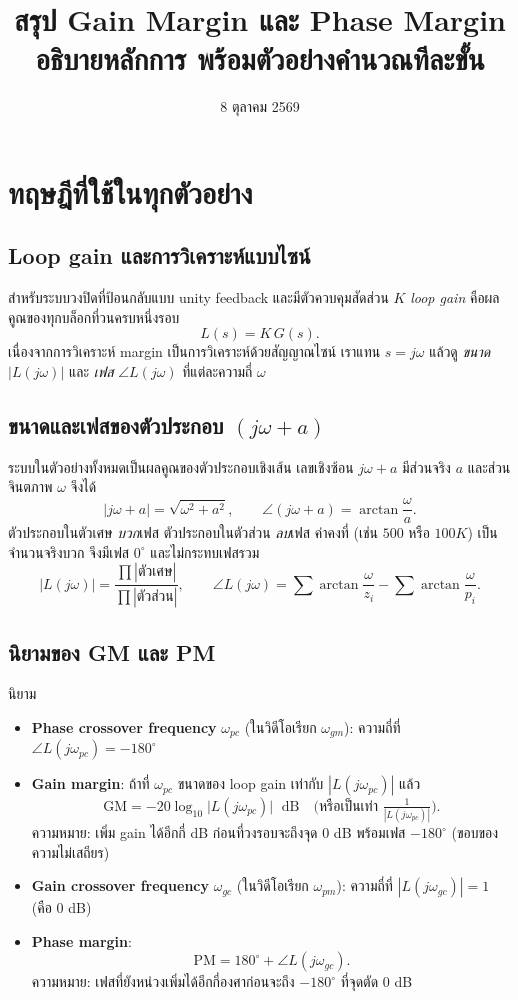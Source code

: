 \documentclass[12pt,a4paper]{article}
\title{สรุป Gain Margin และ Phase Margin\\[2pt]\large อธิบายหลักการ พร้อมตัวอย่างคำนวณทีละขั้น}
\author{}
\date{8 ตุลาคม 2569}
\newcommand{\dB}{\,\mathrm{dB}}
\newcommand{\jw}{j\omega}
\newcommand{\atan}{\operatorname{arctan}}
\begin{document}
\maketitle
\tableofcontents
\bigskip

\section{ทฤษฎีที่ใช้ในทุกตัวอย่าง}

\subsection{Loop gain และการวิเคราะห์แบบไซน์}
สำหรับระบบวงปิดที่ป้อนกลับแบบ unity feedback และมีตัวควบคุมสัดส่วน $K$ \emph{loop gain} คือผลคูณของทุกบล็อกที่วนครบหนึ่งรอบ
\[
L(s)=K\,G(s).
\]
เนื่องจากการวิเคราะห์ margin เป็นการวิเคราะห์ด้วยสัญญาณไซน์ เราแทน $s=\jw$ แล้วดู \emph{ขนาด} $|L(\jw)|$ และ \emph{เฟส} $\angle L(\jw)$ ที่แต่ละความถี่ $\omega$

\subsection{ขนาดและเฟสของตัวประกอบ $(\jw+a)$}
ระบบในตัวอย่างทั้งหมดเป็นผลคูณของตัวประกอบเชิงเส้น เลขเชิงซ้อน $\jw+a$ มีส่วนจริง $a$ และส่วนจินตภาพ $\omega$ จึงได้
\[
|\jw+a|=\sqrt{\omega^{2}+a^{2}},\qquad \angle(\jw+a)=\atan\!\frac{\omega}{a}.
\]
ตัวประกอบในตัวเศษ \emph{บวก}เฟส ตัวประกอบในตัวส่วน \emph{ลบ}เฟส ค่าคงที่ (เช่น $500$ หรือ $100K$) เป็นจำนวนจริงบวก จึงมีเฟส $0^\circ$ และไม่กระทบเฟสรวม
\[
|L(\jw)|=\frac{\prod |\text{ตัวเศษ}|}{\prod |\text{ตัวส่วน}|},\qquad
\angle L(\jw)=\sum\atan\frac{\omega}{z_i}-\sum\atan\frac{\omega}{p_i}.
\]

\subsection{นิยามของ GM และ PM}
\begin{defbox}{นิยาม}
\begin{itemize}[leftmargin=1.2em,itemsep=2pt]
\item \textbf{Phase crossover frequency} $\omega_{pc}$ (ในวิดีโอเรียก $\omega_{gm}$): ความถี่ที่ $\angle L(j\omega_{pc})=-180^\circ$
\item \textbf{Gain margin}: ถ้าที่ $\omega_{pc}$ ขนาดของ loop gain เท่ากับ $|L(j\omega_{pc})|$ แล้ว
\[
\mathrm{GM}=-20\log_{10}\big|L(j\omega_{pc})\big|\ \ \dB
\quad\Big(\text{หรือเป็นเท่า } \tfrac{1}{|L(j\omega_{pc})|}\Big).
\]
ความหมาย: เพิ่ม gain ได้อีกกี่ dB ก่อนที่วงรอบจะถึงจุด $0$ dB พร้อมเฟส $-180^\circ$ (ขอบของความไม่เสถียร)
\item \textbf{Gain crossover frequency} $\omega_{gc}$ (ในวิดีโอเรียก $\omega_{pm}$): ความถี่ที่ $|L(j\omega_{gc})|=1$ (คือ $0$ dB)
\item \textbf{Phase margin}:
\[
\mathrm{PM}=180^\circ+\angle L(j\omega_{gc}).
\]
ความหมาย: เฟสที่ยังหน่วงเพิ่มได้อีกกี่องศาก่อนจะถึง $-180^\circ$ ที่จุดตัด $0$ dB
\end{itemize}
\end{defbox}
\end{document}
